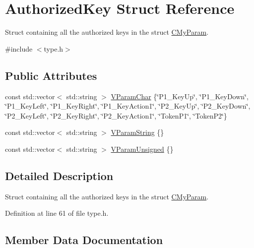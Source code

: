 \hypertarget{struct_authorized_key}{}\section{Authorized\+Key Struct Reference}
\label{struct_authorized_key}


Struct containing all the authorized keys in the struct \hyperlink{struct_c_my_param}{C\+My\+Param}.  




{\ttfamily \#include $<$type.\+h$>$}

\subsection*{Public Attributes}
\begin{DoxyCompactItemize}
\item 
const std\+::vector$<$ std\+::string $>$ \hyperlink{struct_authorized_key_a1b1aa7863427cc1b43f229423bdd83ba}{V\+Param\+Char} \{\char`\"{}P1\+\_\+\+Key\+Up\char`\"{}, \char`\"{}P1\+\_\+\+Key\+Down\char`\"{}, \char`\"{}P1\+\_\+\+Key\+Left\char`\"{}, \char`\"{}P1\+\_\+\+Key\+Right\char`\"{}, \char`\"{}P1\+\_\+\+Key\+Action1\char`\"{}, \char`\"{}P2\+\_\+\+Key\+Up\char`\"{}, \char`\"{}P2\+\_\+\+Key\+Down\char`\"{}, \char`\"{}P2\+\_\+\+Key\+Left\char`\"{}, \char`\"{}P2\+\_\+\+Key\+Right\char`\"{}, \char`\"{}P2\+\_\+\+Key\+Action1\char`\"{}, \char`\"{}Token\+P1\char`\"{}, \char`\"{}Token\+P2\char`\"{}\}
\item 
const std\+::vector$<$ std\+::string $>$ \hyperlink{struct_authorized_key_a14d2cbd0e3dcc77a793a55f988d78b73}{V\+Param\+String} \{\}
\item 
const std\+::vector$<$ std\+::string $>$ \hyperlink{struct_authorized_key_a871173f4b0c89c91289a10f0ddc1cadd}{V\+Param\+Unsigned} \{\}
\end{DoxyCompactItemize}


\subsection{Detailed Description}
Struct containing all the authorized keys in the struct \hyperlink{struct_c_my_param}{C\+My\+Param}. 

Definition at line 61 of file type.\+h.



\subsection{Member Data Documentation}
\mbox{\label{struct_authorized_key_a1b1aa7863427cc1b43f229423bdd83ba}} 
